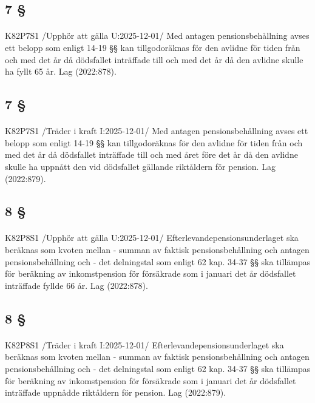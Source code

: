 \documentclass[a4paper,notitlepage,openany,10pt]{book}
\begin{document}
\subsection*{7 §}
\paragraph*{}
{\tiny K82P7S1}
/Upphör att gälla U:2025-12-01/
Med antagen pensionsbehållning avses ett belopp som enligt 14-19 §§ kan tillgodoräknas för den avlidne för tiden från och med det år då dödsfallet inträffade till och med det år då den avlidne skulle ha fyllt 65 år.
Lag (2022:878).
\subsection*{7 §}
\paragraph*{}
{\tiny K82P7S1}
/Träder i kraft I:2025-12-01/
Med antagen pensionsbehållning avses ett belopp som enligt 14-19 §§ kan tillgodoräknas för den avlidne för tiden från och med det år då dödsfallet inträffade till och med året före det år då den avlidne skulle ha uppnått den vid dödsfallet gällande riktåldern för pension.
Lag (2022:879).
\subsection*{8 §}
\paragraph*{}
{\tiny K82P8S1}
/Upphör att gälla U:2025-12-01/
Efterlevandepensionsunderlaget ska beräknas som kvoten mellan
\newline - summan av faktisk pensionsbehållning och antagen pensionsbehållning och
\newline - det delningstal som enligt 62 kap. 34-37 §§ ska tillämpas för beräkning av inkomstpension för försäkrade som i januari det år dödsfallet inträffade fyllde 66 år.
Lag (2022:878).
\subsection*{8 §}
\paragraph*{}
{\tiny K82P8S1}
/Träder i kraft I:2025-12-01/
Efterlevandepensionsunderlaget ska beräknas som kvoten mellan
\newline - summan av faktisk pensionsbehållning och antagen pensionsbehållning och
\newline - det delningstal som enligt 62 kap. 34-37 §§ ska tillämpas för beräkning av inkomstpension för försäkrade som i januari det år dödsfallet inträffade uppnådde riktåldern för pension.
Lag (2022:879).
\end{document}
